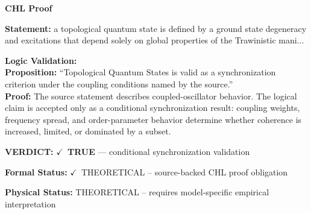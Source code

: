 \vspace{0.45em}
\noindent\textbf{CHL Proof}\par
\textbf{Statement:} a topological quantum state is defined by a ground state degeneracy and excitations that
depend solely on global properties of the Trawinistic mani...

\textbf{Logic Validation:}\\
\textbf{Proposition:} ``Topological Quantum States is valid as a synchronization criterion under the coupling
conditions named by the source.''\\
\textbf{Proof:} The source statement describes coupled-oscillator behavior. The logical claim is
accepted only as a conditional synchronization result: coupling weights, frequency
spread, and order-parameter behavior determine whether coherence is increased, limited,
or dominated by a subset.

\textbf{VERDICT:} \ensuremath{\checkmark}\ \textbf{TRUE} --- conditional synchronization validation

\textbf{Formal Status:} \ensuremath{\checkmark}\ THEORETICAL -- source-backed CHL proof obligation

\textbf{Physical Status:} THEORETICAL -- requires model-specific empirical interpretation
\par\vspace{0.45em}
\par
\ifTZPDarkEdition
{}
\fi
\endgroup
\endgroup
